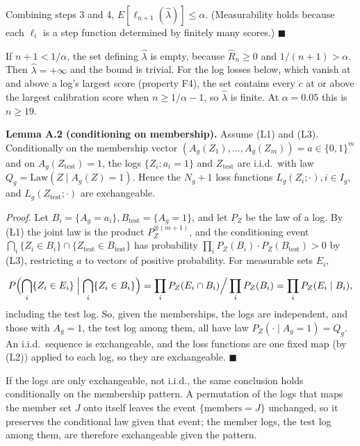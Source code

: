 \documentclass{ieeeaccess}
\begin{document}
Combining steps 3 and 4, $E[\ell_{n+1}(\hat{\lambda})] \leq \alpha$. (Measurability holds because each $\ell_{i}$ is a step function determined by finitely many scores.) $\blacksquare$

If $n + 1 < 1/\alpha$, the set defining $\hat{\lambda}$ is empty, because $\hat{R}_{n} \geq 0$ and $1/(n + 1) > \alpha$. Then $\hat{\lambda} = +\infty$ and the bound is trivial. For the log losses below, which vanish at and above a log's largest score (property F4), the set contains every $c$ at or above the largest calibration score when $n \geq 1/\alpha - 1$, so $\hat{\lambda}$ is finite. At $\alpha = 0.05$ this is $n \geq 19$.

\textbf{Lemma A.2 (conditioning on membership).} Assume (L1) and (L3). Conditionally on the membership vector $(A_{g}(Z_{1}), \dots, A_{g}(Z_{m})) = a \in \{0, 1\}^{m}$ and on $A_{g}(Z_{\mathrm{test}}) = 1$, the logs $\{Z_{i} : a_{i} = 1\}$ and $Z_{\mathrm{test}}$ are i.i.d.\ with law $Q_{g} = \mathrm{Law}(Z \mid A_{g}(Z) = 1)$. Hence the $N_{g} + 1$ loss functions $L_{g}(Z_{i}; \cdot), i \in I_{g}$, and $L_{g}(Z_{\mathrm{test}}; \cdot)$ are exchangeable.

\emph{Proof.} Let $B_{i} = \{A_{g} = a_{i}\}, B_{\mathrm{test}} = \{A_{g} = 1\}$, and let $P_{Z}$ be the law of a log. By (L1) the joint law is the product $P_{Z}^{\otimes(m+1)}$, and the conditioning event $\bigcap_{i}\{Z_{i} \in B_{i}\} \cap \{Z_{\mathrm{test}} \in B_{\mathrm{test}}\}$ has probability $\prod_{i} P_{Z}(B_{i})\cdot P_{Z}(B_{\mathrm{test}}) > 0$ by (L3), restricting $a$ to vectors of positive probability. For measurable sets $E_{i}$,

\begin{equation*}
P\Bigl(\bigcap_i\{Z_i \in E_i\} \Bigm| \bigcap_i\{Z_i \in B_i\}\Bigr) = \prod_i P_Z(E_i \cap B_i)\Big/\prod_i P_Z(B_i) = \prod_i P_Z(E_i \mid B_i),
\end{equation*}
including the test log. So, given the memberships, the logs are independent, and those with $A_{g} = 1$, the test log among them, all have law $P_{Z}(\cdot \mid A_{g} = 1) = Q_{g}$. An i.i.d.\ sequence is exchangeable, and the loss functions are one fixed map (by (L2)) applied to each log, so they are exchangeable. $\blacksquare$

If the logs are only exchangeable, not i.i.d., the same conclusion holds conditionally on the membership pattern. A permutation of the logs that maps the member set $J$ onto itself leaves the event $\{\text{members} = J\}$ unchanged, so it preserves the conditional law given that event; the member logs, the test log among them, are therefore exchangeable given the pattern.
\end{document}
